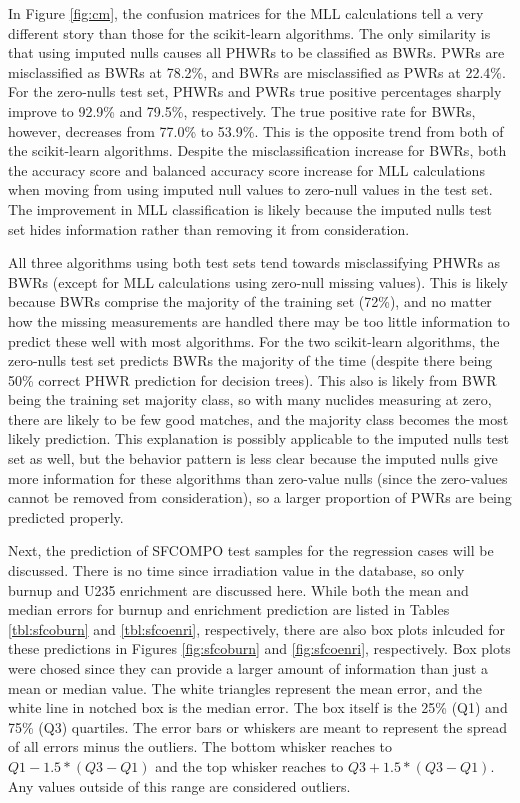 In Figure \ref{fig:cm}, the confusion matrices for the \gls{MLL} calculations
tell a very different story than those for the scikit-learn algorithms.  The
only similarity is that using imputed nulls causes all \gls{PHWR}s to be
classified as \gls{BWR}s. \gls{PWR}s are misclassified as \gls{BWR}s at 78.2\%,
and \gls{BWR}s are misclassified as \gls{PWR}s at 22.4\%. For the zero-nulls
test set, \gls{PHWR}s and \gls{PWR}s true positive percentages sharply improve
to 92.9\% and 79.5\%, respectively.  The true positive rate for \gls{BWR}s,
however, decreases from 77.0\% to 53.9\%. This is the opposite trend from both
of the scikit-learn algorithms.  Despite the misclassification increase for
\gls{BWR}s, both the accuracy score and balanced accuracy score increase for
\gls{MLL} calculations when moving from using imputed null values to zero-null
values in the test set. The improvement in \gls{MLL} classification is likely
because the imputed nulls test set hides information rather than removing it
from consideration. 

All three algorithms using both test sets tend towards misclassifying
\gls{PHWR}s as \gls{BWR}s (except for \gls{MLL} calculations using zero-null
missing values).  This is likely because \gls{BWR}s comprise the majority of
the training set (72\%), and no matter how the missing measurements are handled
there may be too little information to predict these well with most algorithms.
For the two scikit-learn algorithms, the zero-nulls test set predicts
\gls{BWR}s the majority of the time (despite there being 50\% correct
\gls{PHWR} prediction for decision trees). This also is likely from \gls{BWR}
being the training set majority class, so with many nuclides measuring at zero,
there are likely to be few good matches, and the majority class becomes the
most likely prediction. This explanation is possibly applicable to the imputed
nulls test set as well, but the behavior pattern is less clear because the
imputed nulls give more information for these algorithms than zero-value nulls
(since the zero-values cannot be removed from consideration), so a larger
proportion of \gls{PWR}s are being predicted properly.

Next, the prediction of \gls{SFCOMPO} test samples for the regression cases
will be discussed. There is no time since irradiation value in the database, so
only burnup and \gls{U235} enrichment are discussed here.  While both the mean
and median errors for burnup and enrichment prediction are listed in Tables
\ref{tbl:sfcoburn} and \ref{tbl:sfcoenri}, respectively, there are also box
plots inlcuded for these predictions in Figures \ref{fig:sfcoburn} and
\ref{fig:sfcoenri}, respectively.  Box plots were chosed since they can provide
a larger amount of information than just a mean or median value.  The white
triangles represent the mean error, and the white line in notched box is the
median error. The box itself is the 25\% (Q1) and 75\% (Q3) quartiles. The
error bars or whiskers are meant to represent the spread of all errors minus
the outliers.  The bottom whisker reaches to $Q1 - 1.5*(Q3-Q1)$ and the top
whisker reaches to $Q3 + 1.5*(Q3-Q1)$. Any values outside of this range are
considered outliers. \cite{matplotlib}

